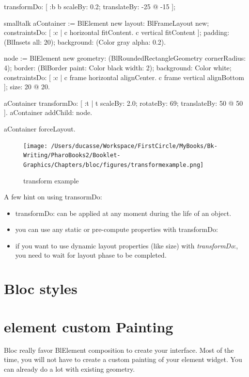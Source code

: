 \documentclass[10pt,twoside,english]{_support/latex/sbabook/sbabook}
\begin{document}
transformDo: {[} :b \textbar{} b scaleBy: 0.2; translateBy: -25 @ -15 {]};
\begin{displaycode}{smalltalk}
aContainer := BlElement new
                    layout: BlFrameLayout new;
                    constraintsDo: [ :c |
                        c horizontal fitContent.
                        c vertical fitContent ];
                    padding: (BlInsets all: 20);
                    background: (Color gray alpha: 0.2).

node := BlElement new
            geometry: (BlRoundedRectangleGeometry cornerRadius: 4);
            border: (BlBorder paint: Color black width: 2);
            background: Color white;
            constraintsDo: [ :c |
                c frame horizontal alignCenter.
                c frame vertical alignBottom ];
            size: 20 @ 20.

aContainer transformDo: [ :t |
    t
        scaleBy: 2.0;
        rotateBy: 69;
        translateBy: 50 @ 50 ].
aContainer addChild: node.

aContainer forceLayout.
\end{displaycode}

\begin{figure}[htpb]
\begin{center}
\texttt{[image: /Users/ducasse/Workspace/FirstCircle/MyBooks/Bk-Writing/PharoBooks2/Booklet-Graphics/Chapters/bloc/figures/transformexample.png]}
\caption{transform example}
\end{center}
\end{figure}


A few hint on using transormDo:

\begin{itemize}
    \item transformDo: can be applied at any moment during the life of an object.
    \item you can use any static or pre-compute properties with transformDo:
    \item if you want to use dynamic layout properties (like size) with \textit{transformDo}:, you need to wait for layout phase to be completed.
\end{itemize}

\chapter{Bloc styles}
\chapter{element custom Painting}
Bloc really favor BlElement composition to create your interface. Most of the
time, you will not have to create a custom painting of your element widget. You
can already do a lot with existing geometry.
\end{document}
